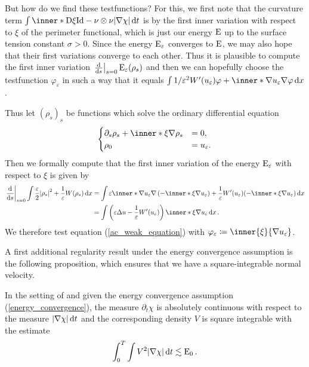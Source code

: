 But how do we find these testfunctions? For this, we first note that the 
curvature term
$ \int \inner*{ \diff \xi }{ \mathrm{Id} - \nu \otimes \nu } \abs{ \nabla \chi 
} \dd{ t } $ is by \cite[Thm.~17.5]{maggi_sets_of_finite_perimeter} the first 
inner variation with respect to $ \xi $ of the perimeter functional, which is 
just our energy $ \operatorname{E} $ up to the surface tension constant $ \sigma > 0 $. 
Since the energy $ \operatorname{E}_{ \varepsilon } $ converges to $ \operatorname{E} $, we may 
also hope that their first variations converge to each other. Thus it is 
plausible to compute the first inner variation 
$ \left.\dv{ s } \right|_{ s = 0 } \operatorname{E}_{ \varepsilon } ( \rho_{ s } ) $ and 
then we can hopefully choose the testfunction $ \varphi_{ \varepsilon } $ in 
such a way that it equals
$ 
\int
1 / \varepsilon^{ 2 }  W' ( u_{ \varepsilon} ) \varphi
+
\inner*{ \nabla u_{ \varepsilon } }{ \nabla \varphi }
\dd{x}
$.

Thus let $ ( \rho_{ s } )_{ s } $ be functions which solve the ordinary 
differential equation
\[
\begin{cases}
	\partial_{ s } \rho_{ s } 
	+
	\inner*{ \xi }{ \nabla \rho_{ s } }
	& = 0,
	\\
	\rho_{ 0 } & = u_{ \varepsilon }.
\end{cases}
\]
Then we formally compute that the first inner variation of the energy $ 
\operatorname{E}_{ \varepsilon } $ with respect to $ \xi $ is given by
\begin{align*}
	\left.\dv{ s }\right|_{ s = 0 }
	\int
	\frac{ \varepsilon }{ 2 }
	\abs{ \rho_{ s } }^{ 2 }
	+
	\frac{ 1 }{ \varepsilon }
	W ( \rho_{ s } )
	\dd{ x }
	& =
	\int
	\varepsilon 
	\inner*{ \nabla u_{ \varepsilon } }
	{ \nabla \left( - \inner*{ \xi }{ \nabla u_{ \varepsilon } } \right) }
	+
	\frac{ 1 }{ \varepsilon }
	W'( u_{ \varepsilon } ) ( -\inner*{ \xi }{ \nabla u_{ \varepsilon } } )
	\dd{ x }
	\\
	& =
	\int
	\left(
	\varepsilon \Delta u - \frac{ 1 }{ \varepsilon } W'( u_{ \varepsilon } )
	\right)
	\inner*{ \xi }{ \nabla u_{ \varepsilon } } 
	\dd{ x }.
\end{align*}
We therefore test equation (\ref{ac_weak_equation}) with $ \varphi_{ 
\varepsilon } \coloneqq \inner{ \xi }{ \nabla u_{ \varepsilon } } $.

A first additional regularity result under the energy convergence assumption is 
the following proposition, which ensures that we have a square-integrable 
normal velocity.

\begin{proposition}
	\label{existence_of_velocity_twophase}
	In the setting of  and given the energy 
	convergence assumption (\ref{energy_convergence}), the measure $ \partial_{ 
		t } \chi $ is absolutely continuous with respect to the measure $ \abs{ 
		\nabla \chi } \dd{ t } $ and the corresponding density $ V $ is square 
	integrable with the estimate
	\begin{equation*}
		\int_{ 0 }^{ T }
		\int
		V^{ 2 }
		\abs{ \nabla \chi }
		\dd{ t }
		\lesssim
		\operatorname{E}_{ 0 }.
	\end{equation*}
\end{proposition}


